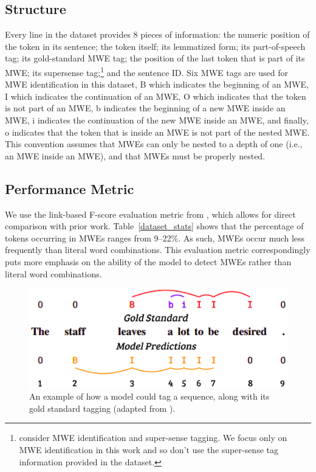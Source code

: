 \documentclass[11pt,a4paper]{article}
\newcommand{\tabref}[1]{Table~\ref{#1}}
\begin{document}
\subsection{Structure}

Every line in the dataset provides 8 pieces of information: the
numeric position of the token in its sentence; the token itself; its
lemmatized form; its part-of-speech tag; its gold-standard MWE tag;
the position of the last token that is part of its MWE; its supersense
tag;\footnote{ consider MWE
  identification and super-sense tagging. We focus only on MWE
  identification in this work and so don't use the super-sense tag
  information provided in the dataset.} and the sentence ID. Six MWE
tags are used for MWE identification in this dataset,
{\selectfont B} which indicates the beginning of an
MWE, {\selectfont I} which indicates the continuation
of an MWE, {\selectfont O} which indicates that the
token is not part of an MWE, {\selectfont b}
indicates the beginning of a new MWE inside an MWE,
{\selectfont i} indicates the continuation of the new
MWE inside an MWE, and finally, {\selectfont o}
indicates that the token that is inside an MWE is not part of the
nested MWE. This convention assumes that MWEs can only be nested to a
depth of one (i.e., an MWE inside an MWE), and that MWEs must be
properly nested.

\subsection{Performance Metric}

We use the link-based F-score evaluation metric from
, which allows for direct
comparison with prior work. \tabref{dataset_stats} shows that the
percentage of tokens occurring in MWEs ranges from 9--22\%. As such,
MWEs occur much less frequently than literal word combinations.  This
evaluation metric correspondingly puts more emphasis on the ability of
the model to detect MWEs rather than literal word combinations.

\begin{figure}
	\includegraphics[width=\linewidth]{AugFscore2.png}
	\caption{An example of how a model could tag a sequence, along
		with its gold standard tagging (adapted from
		).}
	\label{fscore}
\end{figure}
\end{document}
